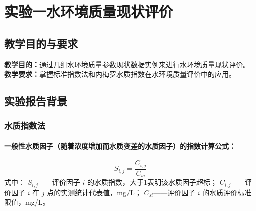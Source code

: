 \null\par
\section{实验一\hspace{1em}水环境质量现状评价}
\subsection{教学目的与要求}

\noindent\textbf{教学目的：}通过几组水环境质量参数现状数据实例来进行水环境质量现状评价。
\newline\textbf{教学要求：}掌握标准指数法和内梅罗水质指数在水环境质量评价中的应用。


\subsection{实验报告背景}
\subsubsection[水质指数法]{水质指数法\protect\cite{HJ2.3-2018}}

\paragraph*{一般性水质因子（随着浓度增加而水质变差的水质因子）的指数计算公式：}
\begin{equation} \label{eq:General water quality factors}
    S_{i,j}=\dfrac{C_{i,j}}{C_{si}}
\end{equation}
式中：
$S_{i,j}$——评价因子 $i$ 的水质指数，大于1表明该水质因子超标；
\newline\phantom{式中：}$C_{i,j}$——评价因子 $i$ 在 $j$ 点的实测统计代表值，mg/L；
\newline\phantom{式中：}$C_{si}$——评价因子 $i$ 的水质评价标准限值，mg/L。

